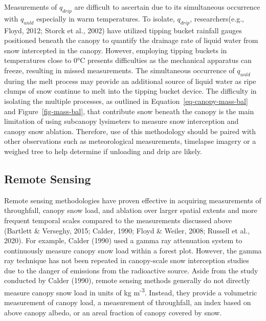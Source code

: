 \documentclass[
  letterpaper,
]{tex/uofsthesis-cs}
\begin{document}
Measurements of \(q_{drip}\) are difficult to ascertain due to its
simultaneous occurrence with \(q_{unld}\) especially in warm
temperatures. To isolate, \(q_{drip}\), researchers(e.g., Floyd, 2012;
Storck et al., 2002) have utilized tipping bucket rainfall gauges
positioned beneath the canopy to quantify the drainage rate of liquid
water from snow intercepted in the canopy. However, employing tipping
buckets in temperatures close to 0°C presents difficulties as the
mechanical apparatus can freeze, resulting in missed measurements. The
simultaneous occurrence of \(q_{unld}\) during the melt process may
provide an additional source of liquid water as ripe clumps of snow
continue to melt into the tipping bucket device. The difficulty in
isolating the multiple processes, as outlined in
Equation~\ref{eq-canopy-mass-bal} and Figure~\ref{fig-mass-bal}, that
contribute snow beneath the canopy is the main limitation of using
subcanopy lysimeters to measure snow interception and canopy snow
ablation. Therefore, use of this methodology should be paired with other
observations such as meteorological measurements, timelapse imagery or a
weighed tree to help determine if unloading and drip are likely.

\subsection{Remote Sensing}\label{remote-sensing}

Remote sensing methodologies have proven effective in acquiring
measurements of throughfall, canopy snow load, and ablation over larger
spatial extents and more frequent temporal scales compared to the
measurements discussed above (Bartlett \& Verseghy, 2015; Calder, 1990;
Floyd \& Weiler, 2008; Russell et al., 2020). For example, Calder (1990)
used a gamma ray attenuation system to continuously measure canopy snow
load within a forest plot. However, the gamma ray technique has not been
repeated in canopy-scale snow interception studies due to the danger of
emissions from the radioactive source. Aside from the study conducted by
Calder (1990), remote sensing methods generally do not directly measure
canopy snow load in units of kg m\textsuperscript{-3}. Instead, they
provide a volumetric measurement of canopy load, a measurement of
throughfall, an index based on above canopy albedo, or an areal fraction
of canopy covered by snow.
\end{document}
